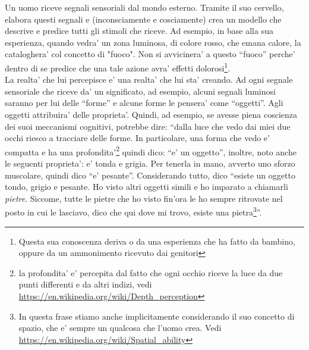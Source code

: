 Un uomo riceve segnali sensoriali dal mondo esterno. Tramite il suo cervello, elabora questi segnali e (inconsciamente e cosciamente) crea un modello che descrive e predice tutti gli stimoli che riceve. Ad esempio, in base alla sua esperienza, quando vedra' un zona luminosa, di colore rosso, che emana calore, la cataloghera' col concetto di "fuoco". Non si avvicinera' a questo ``fuoco'' perche' dentro di se predice che una tale azione avra' effetti dolorosi\footnote{Questa sua conoscenza deriva o da una esperienza che ha fatto da bambino, oppure da un ammonimento ricevuto dai genitori}.\\
La realta' che lui percepisce e' una realta' che lui sta' creando. Ad ogni segnale sensoriale che riceve da' un significato, ad esempio, alcuni segnali luminosi saranno per lui delle ``forme'' e alcune forme le pensera' come ``oggetti''. Agli oggetti attribuira' delle proprieta'.  Quindi, ad esempio, se avesse piena coscienza dei suoi meccanismi cognitivi, potrebbe dire: ``dalla luce che vedo dai miei due occhi riesco a tracciare delle forme. In particolare, una forma che vedo e' compatta e ha una profondita'\footnote{la profondita' e' percepita dal fatto che ogni occhio riceve la luce da due punti differenti e da altri indizi, vedi \url{https://en.wikipedia.org/wiki/Depth\_perception}} quindi dico: ``e' un oggetto'', inoltre, noto anche le seguenti proprieta': e' tonda e grigia. Per tenerla in mano, avverto uno sforzo muscolare, quindi dico ``e' pesante''. Considerando tutto, dico ``esiste un oggetto tondo, grigio e pesante. Ho visto altri oggetti simili e ho imparato a chiamarli \emph{pietre}. Siccome, tutte le pietre che ho visto fin'ora le ho sempre ritrovate nel posto in cui le lasciavo, dico che qui dove mi trovo, esiste una pietra\footnote{In questa frase stiamo anche implicitamente considerando il suo concetto di spazio, che e' sempre un qualcosa che l'uomo crea. Vedi \url{https://en.wikipedia.org/wiki/Spatial\_ability}}''.\\




